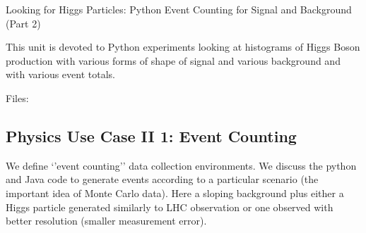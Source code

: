 Looking for Higgs Particles: Python Event Counting for Signal and
Background (Part 2)


This unit is devoted to Python experiments looking at histograms of
Higgs Boson production with various forms of shape of signal and various
background and with various event totals.


Files:









\subsection{Physics Use Case II 1: Event
Counting}\label{physics-use-case-ii-2-event-counting}

We define `'event counting'' data collection environments. We discuss
the python and Java code to generate events according to a particular
scenario (the important idea of Monte Carlo data). Here a sloping
background plus either a Higgs particle generated similarly to LHC
observation or one observed with better resolution (smaller measurement
error).


